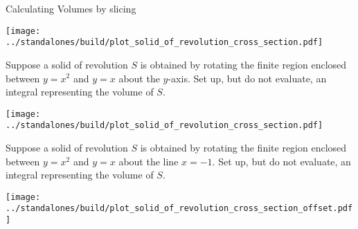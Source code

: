 \documentclass[../main.tex]{subfiles}
\begin{document}
\begin{lesson}{Calculating Volumes by slicing}
\begin{example}
    \texttt{[image: ../standalones/build/plot\_solid\_of\_revolution\_cross\_section.pdf]}
  \end{example}
  \clearpage

  \begin{example}
    Suppose a solid of revolution \(S\) is obtained by rotating the finite region enclosed between \(y = x^{2}\) and \(y = x\) about the \(y\)-axis.  Set up, but do not evaluate, an integral representing the volume of \(S\).

    \begin{center}
      \texttt{[image: ../standalones/build/plot\_solid\_of\_revolution\_cross\_section.pdf]}
    \end{center}
  \end{example}
  \clearpage

  \begin{example}
    Suppose a solid of revolution \(S\) is obtained by rotating the finite region enclosed between \(y = x^{2}\) and \(y = x\) about the line \(x = -1\).  Set up, but do not evaluate, an integral representing the volume of \(S\).

    \begin{center}
      \texttt{[image: ../standalones/build/plot\_solid\_of\_revolution\_cross\_section\_offset.pdf]}
    \end{center}
  \end{example}
\end{lesson}
\end{document}
